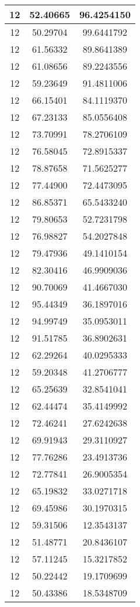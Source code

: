 \documentclass[
]{book}
\begin{document}
\begin{tabular}{c|c|c}
\hline
12 & 52.40665 & 96.4254150\\
\hline
12 & 50.29704 & 99.6441792\\
\hline
12 & 61.56332 & 89.8641389\\
\hline
12 & 61.08656 & 89.2243556\\
\hline
12 & 59.23649 & 91.4811006\\
\hline
12 & 66.15401 & 84.1119370\\
\hline
12 & 67.23133 & 85.0556408\\
\hline
12 & 73.70991 & 78.2706109\\
\hline
12 & 76.58045 & 72.8915337\\
\hline
12 & 78.87658 & 71.5625277\\
\hline
12 & 77.44900 & 72.4473095\\
\hline
12 & 86.85371 & 65.5433240\\
\hline
12 & 79.80653 & 52.7231798\\
\hline
12 & 76.98827 & 54.2027848\\
\hline
12 & 79.47936 & 49.1410154\\
\hline
12 & 82.30416 & 46.9909036\\
\hline
12 & 90.70069 & 41.4667030\\
\hline
12 & 95.44349 & 36.1897016\\
\hline
12 & 94.99749 & 35.0953011\\
\hline
12 & 91.51785 & 36.8902631\\
\hline
12 & 62.29264 & 40.0295333\\
\hline
12 & 59.20348 & 41.2706777\\
\hline
12 & 65.25639 & 32.8541041\\
\hline
12 & 62.44474 & 35.4149992\\
\hline
12 & 72.46241 & 27.6242638\\
\hline
12 & 69.91943 & 29.3110927\\
\hline
12 & 77.76286 & 23.4913736\\
\hline
12 & 72.77841 & 26.9005354\\
\hline
12 & 65.19832 & 33.0271718\\
\hline
12 & 69.45986 & 30.1970315\\
\hline
12 & 59.31506 & 12.3543137\\
\hline
12 & 51.48771 & 20.8436107\\
\hline
12 & 57.11245 & 15.3217852\\
\hline
12 & 50.22442 & 19.1709699\\
\hline
12 & 50.43386 & 18.5348709\\

\end{tabular}
\end{document}
